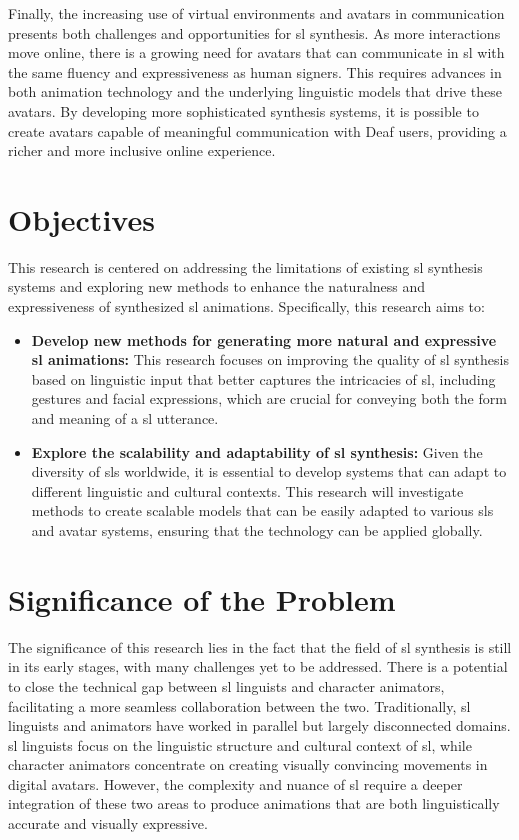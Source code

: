 \documentclass[../../main.tex]{subfiles}
\begin{document}
Finally, the increasing use of virtual environments and avatars in communication presents both challenges and opportunities for \gls{sl} synthesis. As more interactions move online, there is a growing need for avatars that can communicate in \gls{sl} with the same fluency and expressiveness as human signers. This requires advances in both animation technology and the underlying linguistic models that drive these avatars. By developing more sophisticated synthesis systems, it is possible to create avatars capable of meaningful communication with Deaf users, providing a richer and more inclusive online experience.

\section{Objectives}
\label{ch:introduction:objectives}

This research is centered on addressing the limitations of existing \gls{sl} synthesis systems and exploring new methods to enhance the naturalness and expressiveness of synthesized \gls{sl} animations. Specifically, this research aims to:

\begin{itemize}
    \item \textbf{Develop new methods for generating more natural and expressive \gls{sl} animations:} This research focuses on improving the quality of \gls{sl} synthesis based on linguistic input that better captures the intricacies of \gls{sl}, including gestures and facial expressions, which are crucial for conveying both the form and meaning of a \gls{sl} utterance.
    \item \textbf{Explore the scalability and adaptability of \gls{sl} synthesis:} Given the diversity of \gls{sl}s worldwide, it is essential to develop systems that can adapt to different linguistic and cultural contexts. This research will investigate methods to create scalable models that can be easily adapted to various \gls{sl}s and avatar systems, ensuring that the technology can be applied globally.
\end{itemize}

\section{Significance of the Problem}
\label{ch:introduction:significance}

The significance of this research lies in the fact that the field of \gls{sl} synthesis is still in its early stages, with many challenges yet to be addressed. There is a potential to close the technical gap between \gls{sl} linguists and character animators, facilitating a more seamless collaboration between the two. Traditionally, \gls{sl} linguists and animators have worked in parallel but largely disconnected domains. \gls{sl} linguists focus on the linguistic structure and cultural context of \gls{sl}, while character animators concentrate on creating visually convincing movements in digital avatars. However, the complexity and nuance of \gls{sl} require a deeper integration of these two areas to produce animations that are both linguistically accurate and visually expressive.
\end{document}
